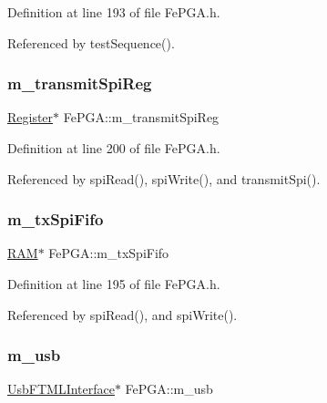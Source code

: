 Definition at line 193 of file Fe\+P\+G\+A.\+h.



Referenced by test\+Sequence().

\mbox{\label{classFePGA_a003ee241fb5f32fb3442174db3fe6f49}} 
\subsubsection{\texorpdfstring{m\+\_\+transmit\+Spi\+Reg}{m\_transmitSpiReg}}
{\footnotesize\ttfamily \hyperlink{classRegister}{Register}$\ast$ Fe\+P\+G\+A\+::m\+\_\+transmit\+Spi\+Reg\hspace{0.3cm}{\ttfamily [private]}}



Definition at line 200 of file Fe\+P\+G\+A.\+h.



Referenced by spi\+Read(), spi\+Write(), and transmit\+Spi().

\mbox{\label{classFePGA_a5b3e4deb73a882e6f044450d8a733558}} 
\subsubsection{\texorpdfstring{m\+\_\+tx\+Spi\+Fifo}{m\_txSpiFifo}}
{\footnotesize\ttfamily \hyperlink{classRAM}{R\+AM}$\ast$ Fe\+P\+G\+A\+::m\+\_\+tx\+Spi\+Fifo\hspace{0.3cm}{\ttfamily [private]}}



Definition at line 195 of file Fe\+P\+G\+A.\+h.



Referenced by spi\+Read(), and spi\+Write().

\mbox{\label{classFePGA_afb7947e600a66d914ee524acec3d8b1f}} 
\subsubsection{\texorpdfstring{m\+\_\+usb}{m\_usb}}
{\footnotesize\ttfamily \hyperlink{classUsbFTMLInterface}{Usb\+F\+T\+M\+L\+Interface}$\ast$ Fe\+P\+G\+A\+::m\+\_\+usb\hspace{0.3cm}{\ttfamily [private]}}



